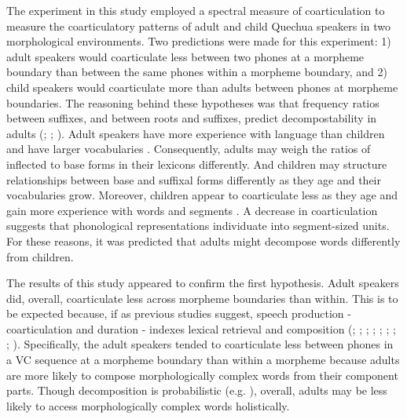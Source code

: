 \documentclass[a4paper,man,floatsintext,natbib,donotrepeattitle, apacite]{apa6}
\begin{document}
The experiment in this study employed a spectral measure of coarticulation to measure the coarticulatory patterns of adult and child Quechua speakers in two morphological environments. Two predictions were made for this experiment: 1) adult speakers would coarticulate less between two phones at a morpheme boundary than between the same phones within a morpheme boundary, and 2) child speakers would coarticulate more than adults between phones at morpheme boundaries. The reasoning behind these hypotheses was that  frequency ratios between suffixes, and between roots and suffixes, predict decompostability in adults (\citealt{hayCausesConsequencesWord2003}; \citealt{kempsProsodicCuesMorphological2005}; \citealt{ingoplagSuffixOrderingMorphological2009}). Adult speakers have more experience with language than children and have larger vocabularies \citep{lorgeEstimatingSizeVocabularies1963}. Consequently, adults may weigh the ratios of inflected to base forms in their lexicons differently. And children may structure relationships between base and suffixal forms differently as they age and their vocabularies grow. Moreover, children appear to coarticulate less as they age and gain more experience with words and segments \citep{noiraySpokenLanguageDevelopment2019}. A decrease in coarticulation suggests that phonological representations individuate into segment-sized units. For these reasons, it was predicted that adults might decompose words differently from children.

The results of this study appeared to confirm the first hypothesis. Adult speakers did, overall, coarticulate less across morpheme boundaries than within. This is to be expected because, if as previous studies suggest, speech production - coarticulation and duration - indexes lexical retrieval and composition (\citealt{choEffectsMorphemeBoundaries2001}; \citealt{kempsProsodicCuesMorphological2005}; \citealt{lee-kimMorphologicalEffectsDarkness2013}; \citealt{plagHomophonyMorphologyAcoustics2017}; \citealt{pluymaekersMorphologicalEffectsFine2010}; \citealt{songEffectsCoarticulationMorphological2013}; \citeyear{songDurationalCuesFricative2013}; \citealt{sugaharaDurationalCorrelatesEnglish2009}; \citealt{tomaschekHowAnticipatoryCoarticulation2019}). Specifically, the adult speakers tended to coarticulate less between phones in a VC sequence at a morpheme boundary than within a morpheme because adults are more likely to compose morphologically complex words from their component parts. Though decomposition is probabilistic (e.g. \citealt{hayCausesConsequencesWord2003}), overall, adults may be less likely to access morphologically complex words holistically. 
\end{document}

